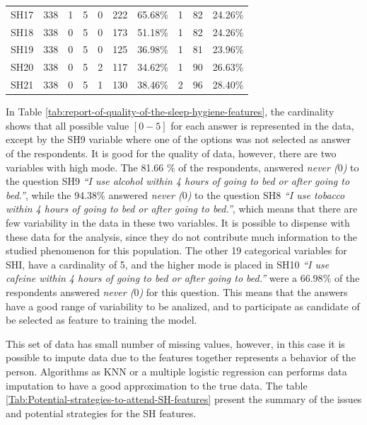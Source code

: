 \documentclass[]{book}
\begin{document}
\begin{table}[ht]
\begin{tabular}{llllllllll}
SH17   & 338    & 1   & 5  & 0     & 222   & 65.68\%   & 1   & 82   & 24.26\%  \\
SH18   & 338    & 0   & 5  & 0     & 173   & 51.18\%   & 1   & 82   & 24.26\%  \\
SH19   & 338    & 0   & 5  & 0     & 125   & 36.98\%   & 1   & 81   & 23.96\%  \\
SH20   & 338    & 0   & 5  & 2     & 117   & 34.62\%   & 1   & 90   & 26.63\%  \\
SH21   & 338    & 0   & 5  & 1     & 130   & 38.46\%   & 2   & 96   & 28.40\%  \\ 
\hline
\end{tabular}
\end{table}

In Table \ref{tab:report-of-quality-of-the-sleep-hygiene-features}, the
cardinality shows that all possible value \([0-5]\) for each answer is
represented in the data, except by the SH9 variable where one of the
options was not selected as answer of the respondents. It is good for
the quality of data, however, there are two variables with high mode.
The 81.66 \% of the respondents, answered \emph{never (\(0\))} to the
question SH9 \emph{``I use alcohol within 4 hours of going to bed or
after going to bed.''}, while the 94.38\% answered \emph{never (\(0\))}
to the question SH8 \emph{``I use tobacco within 4 hours of going to bed
or after going to bed.''}, which means that there are few variability in
the data in these two variables. It is possible to dispense with these
data for the analysis, since they do not contribute much information to
the studied phenomenon for this population. The other 19 categorical
variables for SHI, have a cardinality of 5, and the higher mode is
placed in SH10 \emph{``I use cafeine within 4 hours of going to bed or
after going to bed.''} were a \(66.98\%\) of the respondents answered
\emph{never (\(0\))} for this question. This means that the answers have
a good range of variability to be analized, and to participate as
candidate of be selected as feature to training the model.

This set of data has small number of missing values, however, in this
case it is possible to impute data due to the features together
represents a behavior of the person. Algorithms as KNN or a multiple
logistic regression can performs data imputation to have a good
approximation to the true data. The table
\ref{Tab:Potential-strategies-to-attend-SH-features} present the summary
of the issues and potential strategies for the SH features.
\end{document}
